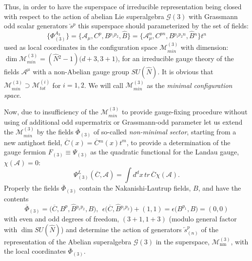 \documentclass[10pt]{article}
\begin{document}
 Thus, in order to have  the superspace of irreducible representation being closed with respect to the action of  abelian Lie superalgebra $\mathcal{G}(3)$   with Grassmann odd scalar generators $\overleftarrow{s}{}^p$ this superspace should  parameterized by the set of fields:
 \begin{equation}\label{N3space}
\{\Phi^{A_3}_{(3)}\}  = \big\{\mathcal{A}_\mu, C^{p}, {B}{}^{p_1p_2}, \widehat{B}\big\} = \big\{\mathcal{A}^n_\mu, C^{p{}n}, {B}{}^{p_1p_2{}{}n}, \widehat{B}{}^n\big\}t^n
  \end{equation}
used as local coordinates in the  configuration space $\mathcal{M}^{(3)}_{min}$ with dimension:
$\dim \mathcal{M}^{(3)}_{min}= (\hat{N}{}^2-1)\big(d+3,3+1 \big) $,
for an irreducible gauge theory of the fields $\mathcal{A}^\mu$ with a non-Abelian gauge group $SU(\hat{N})$.
It is obvious that $\mathcal{M}^{(3)}_{min} \supset \mathcal{M}^{(i)}_{tot}$ for  $i=1,2$.
We will call $\mathcal{M}^{(3)}_{min}$ as the \emph{minimal configuration space}.

Now, due to insufficiency  of the  $\mathcal{M}^{(3)}_{min}$ to provide gauge-fixing procedure without using of  additional  odd supermatrix or Grassmann-odd parameter  let us extend the $\mathcal{M}^{(3)}_{min}$ by  the fields $\overline{\Phi}{}_{(3)}$  of so-called \emph{non-minimal sector}, starting from a new  antighost field, $\overline{C}(x)=\overline{C}{}^m(x)t^m$, to provide a determination of the gauge fermion $F_{(3)}\equiv \Psi_{(3)}$ as the quadratic functional for the Landau gauge, $\chi (\mathcal{A})=0$:
\begin{equation}\label{gfn3}
\Psi^L_{(3)} (\overline{C}, \mathcal{A}) = \int d^dx\, tr\, \overline{C}\chi (\mathcal{A}).
\end{equation}
Properly the fields $\overline{\Phi}{}_{(3)}$ contain the Nakanishi-Lautrup fields,  $B$, and  have the contents
 \begin{equation}\label{fieldsnm3}
   \overline{\Phi}{}_{(3)} = \big( \overline{C}, B^{p}, \widehat{B}{}^{p_1p_2}, B \big), \ \  \epsilon\big(\overline{C},\widehat{B}{}^{p_1p_2}\big)+(1,1)=\epsilon\big(B^{p_1},B\big)=(0,0)
 \end{equation}
with even and odd degrees of freedom, $(3+1, 1+3)$ (modulo general factor with $\dim SU(\hat{N})$) and  determine  the  action of generators $\overleftarrow{s}{}^p_{(n)}$ of the representation of  the Abelian superalgebra $\mathcal{G}(3)$ in the superspace, $\mathcal{M}^{(3)}_{\mathrm{nm}}$,  with the local coordinates $\overline{\Phi}{}_{(3)}$.
\end{document}
